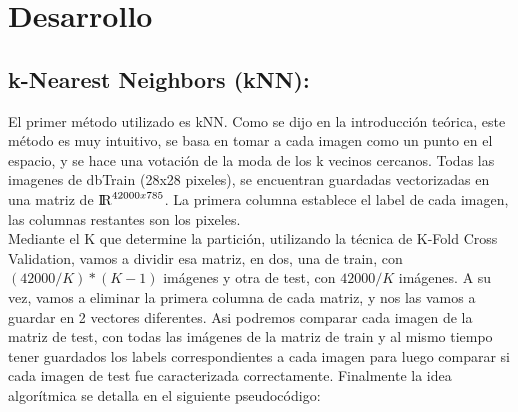 \section{Desarrollo}
\subsection{k-Nearest Neighbors (kNN):}
El primer método utilizado es kNN. Como se dijo en la introducción teórica, este método es muy intuitivo, se basa en tomar a cada imagen como un punto en el espacio, y se hace una votación de la moda de los k vecinos cercanos. Todas las imagenes de dbTrain (28x28 pixeles), se encuentran guardadas vectorizadas en una matriz de ${\rm I\!R}^{42000x785}$. La primera columna establece el label de cada imagen, las columnas restantes son los pixeles.\\
Mediante el K que determine la partición, utilizando la técnica de K-Fold Cross Validation, vamos a dividir esa matriz, en dos, una de train, con $(42000/K)*(K-1)$ imágenes y otra de test, con $42000/K$ imágenes. A su vez, vamos a eliminar la primera columna de cada matriz, y nos las vamos a guardar en 2 vectores diferentes. Asi podremos comparar cada imagen de la matriz de test, con todas las imágenes de la matriz de train y al mismo tiempo tener guardados los labels correspondientes a cada imagen para luego comparar si cada imagen de test fue caracterizada correctamente. Finalmente la idea algorítmica se detalla en el siguiente pseudocódigo:\\
